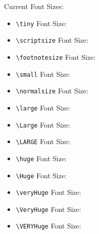 \documentclass[a0,portrait]{lab-poster}
\begin{document}
\begin{multicols}{2}
Current Font Sizes:
\begin{itemize}
	\item {\tiny \verb|\tiny| Font Size: \showfontsize}
	\item {\scriptsize \verb|\scriptsize| Font Size: \showfontsize}
	\item {\footnotesize \verb|\footnotesize| Font Size: \showfontsize}
	\item {\small \verb|\small| Font Size: \showfontsize}
	\item {\normalsize \verb|\normalsize| Font Size: \showfontsize}
	\item {\large \verb|\large| Font Size: \showfontsize}
	\item {\Large \verb|\Large| Font Size: \showfontsize}
	\item {\LARGE \verb|\LARGE| Font Size: \showfontsize}
	\item {\huge \verb|\huge| Font Size: \showfontsize}
	\item {\Huge \verb|\Huge| Font Size: \showfontsize}
	\item {\veryHuge \verb|\veryHuge| Font Size: \showfontsize}
	\item {\VeryHuge \verb|\VeryHuge| Font Size: \showfontsize}
	\item {\VERYHuge \verb|\VERYHuge| Font Size: \showfontsize}
\end{itemize}


%
%

\end{multicols}

\end{document}
